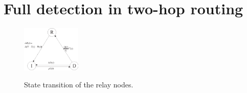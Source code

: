 \section{Full detection in two-hop routing}
\label{sec:full_detect}

\begin{figure}
  \centering
  {\includegraphics[width=0.25\textwidth]
  {fig/state_transition_detect.eps}}
     \caption{State transition of the relay nodes.}
     \label{fig:ss_dt}
\end{figure}
